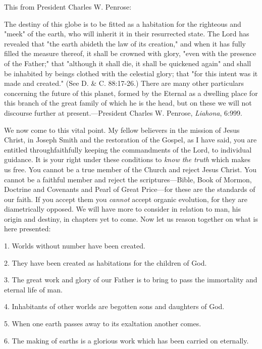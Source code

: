 This from President Charles W. Penrose:

The destiny of this globe is to be fitted as a habitation for the righteous and "meek" of the
earth, who will inherit it in their resurrected state. The Lord has revealed that "the earth
abideth the law of its creation," and when it has fully filled the measure thereof, it shall be
crowned with glory, "even with the presence of the Father;" that "although it shall die, it shall
be quickened again" and shall be inhabited by beings clothed with the celestial glory; that
"for this intent was it made and created." (See D. \& C. 88:17-26.) There are many other
particulars concerning the future of this planet, formed by the Eternal as a dwelling place for
this branch of the great family of which he is the head, but on these we will not discourse
further at present.—President Charles W. Penrose, \textit{Liahona}, 6:999.

We now come to this vital point. My fellow believers in the mission of Jesus Christ, in
Joseph Smith and the restoration of the Gospel, as I have said, you are entitled throughfaithfully keeping the commandments of the Lord, to individual guidance. It is your right
under these conditions to \textit{know the truth} which makes us free. You cannot be a true member
of the Church and reject Jesus Christ. You cannot be a faithful member and reject the
scriptures—Bible, Book of Mormon, Doctrine and Covenants and Pearl of Great Price—for
these are the standards of our faith. If you accept them you \textit{cannot} accept organic evolution,
for they are diametrically opposed. We will have more to consider in relation to man, his
origin and destiny, in chapters yet to come. Now let us reason together on what is here
presented:

1. Worlds without number have been created.

2. They have been created as habitations for the children of God.

3. The great work and glory of our Father is to bring to pass the immortality and eternal life
of man.

4. Inhabitants of other worlds are begotten sons and daughters of God.

5. When one earth passes away to its exaltation another comes.

6. The making of earths is a glorious work which has been carried on eternally.

